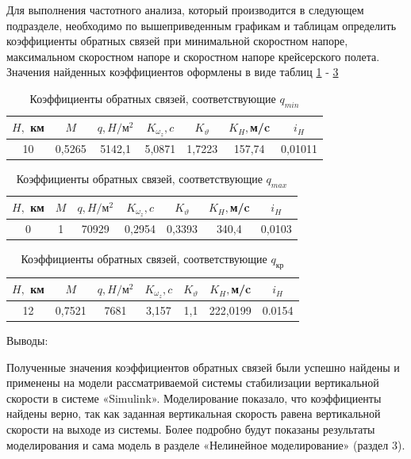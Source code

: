 Для выполнения частотного анализа, который производится в следующем подразделе, необходимо по вышеприведенным графикам и таблицам определить коэффициенты обратных связей при минимальной скоростном напоре, максимальном скоростном напоре и скоростном напоре крейсерского полета. Значения найденных коэффициентов оформлены в виде таблиц \ref{tab:q_min} - \ref{tab:q_kr}


\begin{table}[H]
    \centering
    \caption{Коэффициенты обратных связей, соответствующие $q_{min}$}
    \begin{tabular}{|c|c|c|c|c|c|c|}
    \hline
        $H,$ км & $M$ & $q, H / \text{м}^2$ & $K_{\omega_z}, c$ & $K_\vartheta$ & $K_H,$м/c &$i_H$\\ \hline
        10& 0,5265& 5142,1 & 5,0871 &1,7223 & 157,74& 0,01011\\ \hline
    \end{tabular}
    \label{tab:q_min}
\end{table}

\begin{table}[H]
    \centering
    \caption{Коэффициенты обратных связей, соответствующие $q_{max}$}
    \begin{tabular}{|c|c|c|c|c|c|c|}
    \hline
        $H,$ км & $M$ & $q, H / \text{м}^2$ & $K_{\omega_z}, c$ & $K_\vartheta$ & $K_H,$м/c &$i_H$ \\ \hline
        0& 1 &70929 & 0,2954 & 0,3393&340,4&0,0103\\ \hline
    \end{tabular}
    \label{tab:q_max}
\end{table}


\begin{table}[H]
    \centering
    \caption{Коэффициенты обратных связей, соответствующие $q_\text{кр}$}
    \begin{tabular}{|c|c|c|c|c|c|c|}
    \hline
        $H,$ км & $M$ & $q, H / \text{м}^2$ & $K_{\omega_z}, c$ & $K_\vartheta$ & $K_H,$м/c &$i_H$ \\ \hline
        12&0,7521 &7681 &3,157 & 1,1 &222,0199 &0.0154\\ \hline
    \end{tabular}
    \label{tab:q_kr}
\end{table}

\begin{center}
    Выводы:
\end{center}

Полученные значения коэффициентов обратных связей были успешно найдены и применены на модели рассматриваемой системы стабилизации вертикальной скорости в системе «Simulink». Моделирование показало, что коэффициенты найдены верно, так как заданная вертикальная скорость равена вертикальной скорости на выходе из системы. Более подробно будут показаны результаты моделирования и сама модель в разделе «Нелинейное моделирование» (раздел 3).

